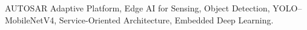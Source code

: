 \documentclass[conference]{IEEEtran}
\begin{document}
\begin{IEEEkeywords}
AUTOSAR Adaptive Platform, Edge AI for Sensing, Object Detection, YOLO--MobileNetV4, Service-Oriented Architecture, Embedded Deep Learning.
\end{IEEEkeywords}






% 






\end{document}
